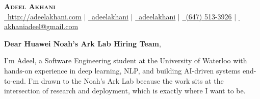 \documentclass[letterpaper,11pt]{article}
\begin{document}
\begin{center}
    \textbf{\Huge \scshape Adeel Akhani} \\ \vspace{1pt}
    \small
    \href{http://adeelakhani.com/}{\faGlobe\, \underline{http://adeelakhani.com}} $|$
    \href{https://www.linkedin.com/in/adeelakhani/}{\faLinkedin\, \underline{adeelakhani}} $|$ 
    \href{https://github.com/adeelakhani}{\faGithub\, \underline{adeelakhani}} $|$
    \href{tel:(647) 513-3926}{\faMobile*\, (647) 513-3926} $|$
    \href{mailto:akhaniadeel@gmail.com}{\faEnvelope\, \underline{akhaniadeel@gmail.com}}
\end{center}

\vspace{15pt}

\noindent \textbf{Dear Huawei Noah’s Ark Lab Hiring Team},

\vspace{10pt}

I’m Adeel, a Software Engineering student at the University of Waterloo with hands-on experience in deep learning, NLP, and building AI-driven systems end-to-end. I’m drawn to the Noah’s Ark Lab because the work sits at the intersection of research and deployment, which is exactly where I want to be.
\end{document}
